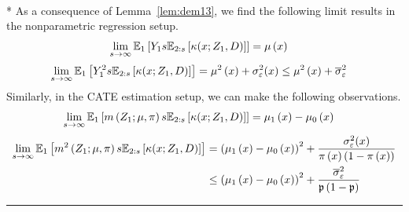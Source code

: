 \begin{lem}\label{lem:limit_res}\mbox{}\\*
	As a consequence of Lemma~\ref{lem:dem13}, we find the following limit results in the nonparametric regression setup.
	\begin{equation}
		\begin{aligned}
			\lim_{s \rightarrow \infty} \mathbb{E}_{1}\left[Y_1 s \mathbb{E}_{2:s}\left[\kappa(x; Z_1, D)\right]\right]
			 & = \mu\left(x\right)
		\end{aligned}
	\end{equation}
	\begin{equation}
		\begin{aligned}
			\lim_{s \rightarrow \infty} \mathbb{E}_{1}\left[Y_1^2 s \mathbb{E}_{2:s}\left[\kappa(x; Z_1, D)\right]\right]
			 & = \mu^2\left(x\right) + \sigma_{\varepsilon}^{2}(x)
			\leq \mu^2\left(x\right) + \overline{\sigma}_{\varepsilon}^{2}
		\end{aligned}
	\end{equation}
	Similarly, in the CATE estimation setup, we can make the following observations.
	\begin{equation}
		\begin{aligned}
			\lim_{s \rightarrow \infty} \mathbb{E}_{1}\left[m\left(Z_{1}; \mu, \pi\right) s \mathbb{E}_{2:s}\left[\kappa(x; Z_1, D)\right]\right]
			 & = \mu_1\left(x\right) - \mu_0\left(x\right)
		\end{aligned}
	\end{equation}
	\begin{equation}
		\begin{aligned}
			\lim_{s \rightarrow \infty} \mathbb{E}_{1}\left[m^2\left(Z_{1}; \mu, \pi\right) s \mathbb{E}_{2:s}\left[\kappa(x; Z_1, D)\right]\right]
			 & = \left(\mu_1\left(x\right) - \mu_0\left(x\right)\right)^2 + \frac{\sigma_{\varepsilon}^2(x)}{\pi\left(x\right)\left(1 - \pi\left(x\right)\right)}  \\
			 & \leq \left(\mu_1\left(x\right) - \mu_0\left(x\right)\right)^2 + \frac{\overline{\sigma}_{\varepsilon}^2}{\mathfrak{p}\left(1 - \mathfrak{p}\right)}
		\end{aligned}
	\end{equation}
\end{lem}

\hrule

